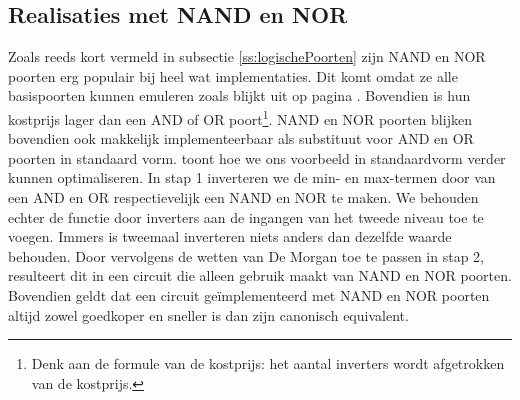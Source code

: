 \subsection{Realisaties met NAND en NOR}
Zoals reeds kort vermeld in subsectie \ref{ss:logischePoorten} zijn NAND en NOR poorten erg populair bij heel wat implementaties. Dit komt omdat ze alle basispoorten kunnen emuleren zoals blijkt uit  op pagina \pageref{tbl:nandNorUniversal}. Bovendien is hun kostprijs lager dan een AND of OR poort\footnote{Denk aan de formule van de kostprijs: het aantal inverters wordt afgetrokken van de kostprijs.}. NAND en NOR poorten blijken bovendien ook makkelijk implementeerbaar als substituut voor AND en OR poorten in standaard vorm.  toont hoe we ons voorbeeld in standaardvorm verder kunnen optimaliseren. In stap 1 inverteren we de min- en max-termen door van een AND en OR respectievelijk een NAND en NOR te maken. We behouden echter de functie door inverters aan de ingangen van het tweede niveau toe te voegen. Immers is tweemaal inverteren niets anders dan dezelfde waarde behouden. Door vervolgens de wetten van De Morgan toe te passen in stap 2, resulteert dit in een circuit die alleen gebruik maakt van NAND en NOR poorten. Bovendien geldt dat een circuit ge\"implementeerd met NAND en NOR poorten altijd zowel goedkoper en sneller is dan zijn canonisch equivalent.
